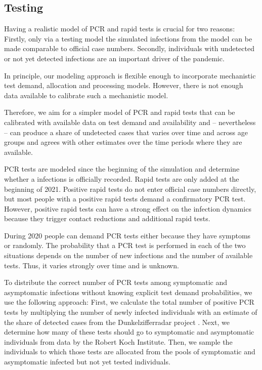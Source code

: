 \subsection{Testing} %
\label{sub:testing}

Having a realistic model of PCR and rapid tests is crucial for two reasons: Firstly,
only via a testing model the simulated infections from the model can be made comparable
to official case numbers. Secondly, individuals with undetected or not yet detected
infections are an important driver of the pandemic.

In principle, our modeling approach is flexible enough to incorporate mechanistic test
demand, allocation and processing models. However, there is not enough data available to
calibrate such a mechanistic model.

Therefore, we aim for a simpler model of PCR and rapid tests that can be calibrated with
available data on test demand and availability and -- nevertheless -- can produce a share
of undetected cases that varies over time and across age groups and agrees with other
estimates over the time periods where they are available.

PCR tests are modeled since the beginning of the simulation and determine whether a
infections is officially recorded. Rapid tests are only added at the beginning of 2021.
Positive rapid tests do not enter official case numbers directly, but most people with a
positive rapid tests demand a confirmatory PCR test. However, positive rapid tests can
have a strong effect on the infection dynamics because they trigger contact reductions
and additional rapid tests.

During 2020 people can demand PCR tests either because they have symptoms or randomly.
The probability that a PCR test is performed in each of the two situations depends on the
number of new infections and the number of available tests. Thus, it varies strongly over
time and is unknown.

To distribute the correct number of PCR tests among symptomatic and asymptomatic
infections without knowing explicit test demand probabilities, we use the following
approach: First, we calculate the total number of positive PCR tests by multiplying the
number of newly infected individuals with an estimate of the share of detected cases from
the Dunkelzifferradar project \citep{Dunkelzifferradar2020}. Next, we determine how many of these tests
should go to symptomatic and asymptomatic individuals from data by the Robert Koch
Institute. 
Then, we sample the individuals to which those tests are allocated from the pools of
symptomatic and asymptomatic infected but not yet tested individuals.

